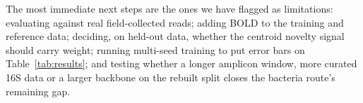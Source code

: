 \documentclass[conference]{IEEEtran}
\begin{document}
The most immediate next steps are the ones we have flagged as limitations: evaluating against real field-collected reads; adding BOLD to the training and reference data; deciding, on held-out data, whether the centroid novelty signal should carry weight; running multi-seed training to put error bars on Table~\ref{tab:results}; and testing whether a longer amplicon window, more curated 16S data or a larger backbone on the rebuilt split closes the bacteria route's remaining gap.



\end{document}
